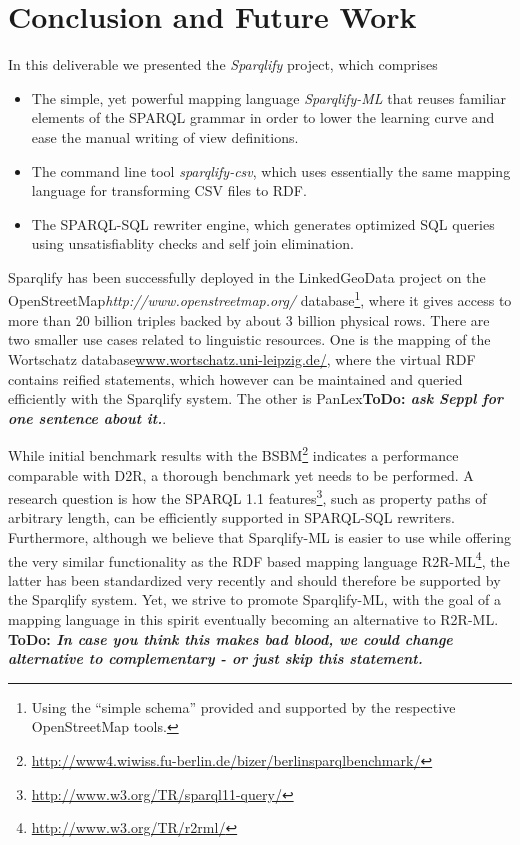 \documentclass[a4paper,twoside,bibtotoc,abstracton,12pt,BCOR=15mm]{scrreprt}
\newcommand{\todo}[1]{\textbf{ToDo: \textit{#1}}}
\begin{document}
\section{Conclusion and Future Work}
In this deliverable we presented the \emph{Sparqlify} project, which comprises
\begin{itemize}
  \item The simple, yet powerful mapping language \emph{Sparqlify-ML} that reuses familiar elements of the SPARQL grammar
  in order to lower the learning curve and ease the manual writing of view definitions.
  \item The command line tool \emph{sparqlify-csv}, which uses essentially the same mapping language for transforming CSV files to RDF. 
  \item The SPARQL-SQL rewriter engine, which generates optimized SQL queries using unsatisfiablity checks and self join elimination.   
\end{itemize}

Sparqlify has been successfully deployed in the LinkedGeoData project on the
OpenStreetMap\emph{http://www.openstreetmap.org/}
database\footnote{Using the ``simple schema'' provided and supported by the respective OpenStreetMap tools.},
where it gives access to more than 20 billion triples backed by about 3 billion physical rows.
There are two smaller use cases related to linguistic resources. 
One is the mapping of the Wortschatz database\url{www.wortschatz.uni-leipzig.de/}, where the virtual RDF contains reified statements, which however can be maintained and queried efficiently with the Sparqlify system.
The other is PanLex\todo{ask Seppl for one sentence about it.}.


While initial benchmark results with the BSBM\footnote{\url{http://www4.wiwiss.fu-berlin.de/bizer/berlinsparqlbenchmark/}} indicates a performance comparable with D2R, a thorough benchmark yet needs to be performed.
A research question is how the SPARQL 1.1 features\footnote{\url{http://www.w3.org/TR/sparql11-query/}}, such as property paths of arbitrary length, can be efficiently supported in SPARQL-SQL rewriters.
Furthermore, although we believe that Sparqlify-ML is easier to use while offering the very similar functionality as the RDF based mapping language R2R-ML\footnote{\url{http://www.w3.org/TR/r2rml/}},
the latter has been standardized very recently and should therefore be supported by the Sparqlify system. Yet, we strive to promote Sparqlify-ML,
with the goal of a mapping language in this spirit eventually becoming an alternative to R2R-ML.
\todo{In case you think this makes bad blood, we could change alternative to complementary - or just skip this statement.} 
\end{document}
